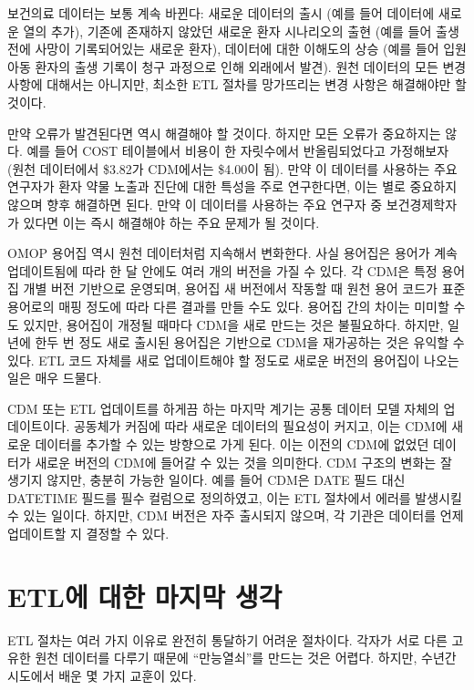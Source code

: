 \documentclass[10.5pt]{book}
\theoremstyle{definition}
\theoremstyle{definition}
\theoremstyle{definition}
\theoremstyle{remark}
\begin{document}
보건의료 데이터는 보통 계속 바뀐다: 새로운 데이터의 출시 (예를 들어
데이터에 새로운 열의 추가), 기존에 존재하지 않았던 새로운 환자
시나리오의 출현 (예를 들어 출생 전에 사망이 기록되어있는 새로운 환자),
데이터에 대한 이해도의 상승 (예를 들어 입원 아동 환자의 출생 기록이 청구
과정으로 인해 외래에서 발견). 원천 데이터의 모든 변경 사항에 대해서는
아니지만, 최소한 ETL 절차를 망가뜨리는 변경 사항은 해결해야만 할 것이다.

만약 오류가 발견된다면 역시 해결해야 할 것이다. 하지만 모든 오류가
중요하지는 않다. 예를 들어 COST 테이블에서 비용이 한 자릿수에서
반올림되었다고 가정해보자 (원천 데이터에서 \$3.82가 CDM에서는 \$4.00이
됨). 만약 이 데이터를 사용하는 주요 연구자가 환자 약물 노출과 진단에
대한 특성을 주로 연구한다면, 이는 별로 중요하지 않으며 향후 해결하면
된다. 만약 이 데이터를 사용하는 주요 연구자 중 보건경제학자가 있다면
이는 즉시 해결해야 하는 주요 문제가 될 것이다.

OMOP 용어집 역시 원천 데이터처럼 지속해서 변화한다. 사실 용어집은 용어가
계속 업데이트됨에 따라 한 달 안에도 여러 개의 버전을 가질 수 있다. 각
CDM은 특정 용어집 개별 버전 기반으로 운영되며, 용어집 새 버전에서 작동할
때 원천 용어 코드가 표준 용어로의 매핑 정도에 따라 다른 결과를 만들 수도
있다. 용어집 간의 차이는 미미할 수도 있지만, 용어집이 개정될 때마다
CDM을 새로 만드는 것은 불필요하다. 하지만, 일 년에 한두 번 정도 새로
출시된 용어집은 기반으로 CDM을 재가공하는 것은 유익할 수 있다. ETL 코드
자체를 새로 업데이트해야 할 정도로 새로운 버전의 용어집이 나오는 일은
매우 드물다.

CDM 또는 ETL 업데이트를 하게끔 하는 마지막 계기는 공통 데이터 모델
자체의 업데이트이다. 공동체가 커짐에 따라 새로운 데이터의 필요성이
커지고, 이는 CDM에 새로운 데이터를 추가할 수 있는 방향으로 가게 된다.
이는 이전의 CDM에 없었던 데이터가 새로운 버전의 CDM에 들어갈 수 있는
것을 의미한다. CDM 구조의 변화는 잘 생기지 않지만, 충분히 가능한 일이다.
예를 들어 CDM은 DATE 필드 대신 DATETIME 필드를 필수 컬럼으로 정의하였고,
이는 ETL 절차에서 에러를 발생시킬 수 있는 일이다. 하지만, CDM 버전은
자주 출시되지 않으며, 각 기관은 데이터를 언제 업데이트할 지 결정할 수
있다.

\section{ETL에 대한 마지막 생각}\label{etl---}

ETL 절차는 여러 가지 이유로 완전히 통달하기 어려운 절차이다. 각자가 서로
다른 고유한 원천 데이터를 다루기 때문에 ``만능열쇠''를 만드는 것은
어렵다. 하지만, 수년간 시도에서 배운 몇 가지 교훈이 있다.
\end{document}

